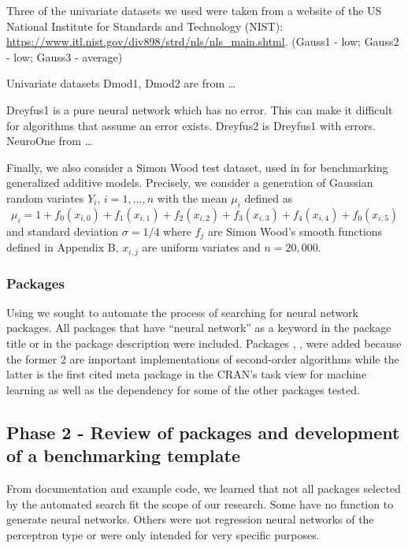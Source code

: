 Three of the univariate datasets we used were taken from a website of
the US National Institute for Standards and Technology (NIST):
\url{https://www.itl.nist.gov/div898/strd/nls/nls_main.shtml}. (Gauss1 -
low; Gauss2 - low; Gauss3 - average)

Univariate datasets Dmod1, Dmod2 are from \ldots{}

Dreyfus1 is a pure neural network which has no error. This can make it
difficult for algorithms that assume an error exists. Dreyfus2 is
Dreyfus1 with errors. NeuroOne from \ldots{}

Finally, we also consider a Simon Wood test dataset, used in
\citep{wood2011fast} for benchmarking generalized additive models.
Precisely, we consider a generation of Gaussian random variates \(Y_i\),
\(i=1,\dots,n\) with the mean \(\mu_i\) defined as \[
\mu_i = 1+ f_0(x_{i,0})+f_1(x_{i,1})+f_2(x_{i,2})+f_3(x_{i,3})
+f_4(x_{i,4})+f_0(x_{i,5})
\] and standard deviation \(\sigma=1/4\) where \(f_j\) are Simon Wood's
smooth functions defined in Appendix B, \(x_{i,j}\) are uniform variates
and \(n=20,000\).

\hypertarget{packages}{%
\subsubsection{Packages}\label{packages}}

Using  \citep{R-RWsearch} we sought to automate the
process of searching for neural network packages. All packages that have
``neural network'' as a keyword in the package title or in the package
description were included. Packages , ,
 were added because the former 2 are important
implementations of second-order algorithms while the latter is the first
cited meta package in the CRAN's task view for machine learning as well
as the dependency for some of the other packages tested.

\hypertarget{phase-2---review-of-packages-and-development-of-a-benchmarking-template}{%
\subsection{Phase 2 - Review of packages and development of a
benchmarking
template}\label{phase-2---review-of-packages-and-development-of-a-benchmarking-template}}

From documentation and example code, we learned that not all packages
selected by the automated search fit the scope of our research. Some
have no function to generate neural networks. Others were not regression
neural networks of the perceptron type or were only intended for very
specific purposes.

